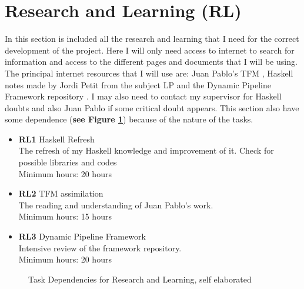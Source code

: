 \section{Research and Learning \textbf{(RL)}}
In this section is included all the research and learning that I need for the correct development of the project.
Here I will only need access to internet to search for information and access to the different pages and documents that I will be using.
The principal internet resources that I will use are: Juan Pablo's TFM \cite{TFM}, Haskell notes made by Jordi Petit from the subject LP \cite{ApuntesHaskell} and the Dynamic Pipeline Framework repository \cite{GitHubDynamicPipeline}.
I may also need to contact my supervisor for Haskell doubts and also Juan Pablo if some critical doubt appears.
This section also have some dependence (\textbf{see Figure \ref{RL_dependences}}) because of the nature of the tasks.
\begin{itemize}
    \item \textbf{RL1} Haskell Refresh \\
        The refresh of my Haskell knowledge and improvement of it. 
        Check for possible libraries and codes \\
        Minimum hours: 20 hours
    \item \textbf{RL2} TFM assimilation\\
        The reading and understanding of Juan Pablo's work. \\
        Minimum hours: 15 hours
    \item \textbf{RL3} Dynamic Pipeline Framework \\
        Intensive review of the framework repository. \\
        Minimum hours: 20 hours 
\end{itemize}
\begin{figure}[h]
    \centering
    \caption{Task Dependencies for Research and Learning, self elaborated}
    \label{RL_dependences}
\end{figure}


